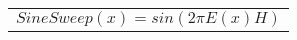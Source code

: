\documentclass[
  border=2,
  convert={
    density=100 -alpha remove,
    outext=.png
  },
]{standalone}
\begin{document}
\begin{tabular}{l}
  $ \displaystyle SineSweep(x) = sin(2 \pi E(x) H)$
\end{tabular}
\end{document}

